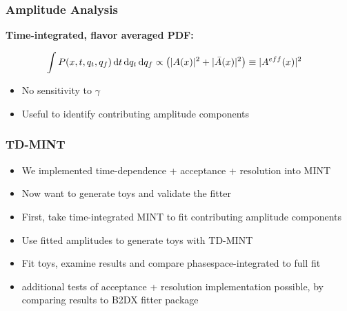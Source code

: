 \documentclass[]{beamer}
\begin{document}
\begin{frame}
	\frametitle{Amplitude Analysis}

	\centering
		\small
	\textbf{Time-integrated, flavor averaged PDF:}
	
		\scriptsize

\begin{block}{}
\begin{align*}
	\int P(x,t,q_t,q_f) \, \text d t \, \text d q_t \, \text d q_f &\propto   \left( \vert A(x) \vert^2 + \vert \bar A(x) \vert^2 \right) \equiv \vert A^{eff}(x) \vert^2
\end{align*}
\end{block}

	\begin{block}{}
	\begin{itemize}
		\item No sensitivity to $\gamma$
		\item Useful to identify contributing amplitude components
	\end{itemize}
	\end{block}	

\end{frame}



\begin{frame}
\frametitle{TD-MINT}

\begin{itemize}

\item We implemented time-dependence + acceptance + resolution into MINT 

\item Now want to generate toys and validate the fitter

\item First, take time-integrated MINT to fit contributing amplitude components

\item Use fitted amplitudes to generate toys with TD-MINT

\item Fit toys, examine results and compare phasespace-integrated to full fit 

\item additional tests of acceptance + resolution implementation possible, by comparing results to B2DX fitter package 

\end{itemize}


\end{frame}
\end{document}
